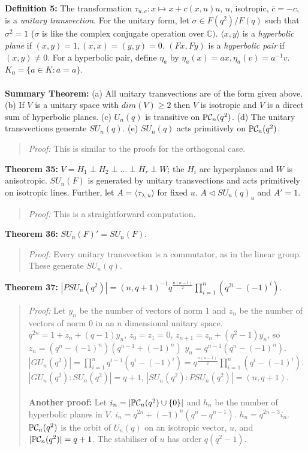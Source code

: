 {\bf Definition 5:} The transformation 
$\tau_{u,c}: x \mapsto x + c(x, u)u$, $u$, isotropic, ${\overline c} = - c$, is a 
\emph{unitary transvection}.  For the unitary form, let $\sigma \in F(q^2)/F(q)$ such
that $\sigma^2=1$ ($\sigma$ is like the complex conjugate operation over ${\mathbb C})$.
$ \langle x, y \rangle $ is a \emph{hyperbolic plane} if 
$(x, y)= 1, (x,x)=(y,y)=0$. $(Fx, Fy)$ is a
\emph{hyperbolic pair} if $(x,y) \ne 0$.  For a hyperbolic pair, define $\eta_a$ by
$\eta_a(x)= ax, \eta_a(v)= a^{-1}v$.  $K_0= \{ a \in K: {\overline a} = a \}$.
\\
\\
{\bf Summary Theorem:} (a) All unitary transvections are of the form given above.  (b) If $V$ is a unitary
space with $dim(V) \geq 2$ then $V$ is isotropic and $V$ is a direct sum of hyperbolic planes.
(c) $U_n(q)$ is transitive on ${\mathbb P}{\cal C}_n(q^2)$.  (d) The unitary transvections
generate $SU_n(q)$. (e) $SU_n(q)$ acts primitively on ${\mathbb P}{\cal C}_n(q^2)$.
\begin{quote}
\emph{Proof:}  
This is similar to the proofs for the orthogonal case.
\end{quote}
{\bf Theorem 35:}
$V = H_1 \perp H_2 \perp \ldots \perp H_r \perp W$; the $H_i$ are hyperplanes and $W$ is
anisotropic.
$SU_n(F)$ is generated by unitary transvections and acts primitively on isotropic lines.
Further, let $A= \langle \tau_{\lambda,u} \rangle $ for fixed $u$.  
$A \lhd SU_n(q)_u$ and $A' = 1$.
\begin{quote}
\emph{Proof:}  
This is a straightforward computation.
\end{quote}
{\bf Theorem 36:}
$SU_n(F)'=SU_n(F)$.
\begin{quote}
\emph{Proof:}  
Every unitary transvection is a commutator, as in the linear group.  These generate
$SU_n(q)$.
\end{quote}
{\bf Theorem 37:} 
$|PSU_n(q^2)|= (n, q+1)^{-1} q^{\frac {n(n-1)} {2}} \prod_{i=1}^n (q^{2i}-(-1)^i)$.
\begin{quote}
\emph{Proof:}  
Let $y_n$ be the number of vectors of norm $1$ and $z_n$ be the number of vectors of norm $0$ in an $n$
dimensional unitary space.
$q^{2n}= 1+ z_n + (q-1) y_n$, $z_0 = z_1 =0$,
$z_{n+1}= z_n + (q^2-1) y_n$, so 
$z_n= (q^n - (-1)^n)(q^{n-1} + (-1)^n)$
$y_n= q^{n-1}(q^n - (-1)^n)$.\\
$|GU_n(q^2)|= \prod_{i=1}^n q^{i-1} (q^i - (-1)^i)= q^{\frac {n(n-1)} 2} \prod_{i=1}^n (q^i - (-1)^i)$. \\
$|GU_n(q^2):SU_n(q^2)|= q+1$,
$|SU_n(q^2):PSU_n(q^2)|= (n,q+1)$.
\\
\\
{\bf Another proof:} Let $i_n= |{\mathbb P}{\cal C}_n(q^2) \cup \{0\}|$ and $h_n$ be the number of hyperbolic planes in $V$.
$i_n= q^{2n} + (-1)^n(q^n-q^{n-1})$. $h_n = q^{2n-3} i_n$.  ${\mathbb P}{\cal C}_n(q^2)$ is the orbit of $U_n(q)$ on
an isotropic vector, $u$, and $|{\mathbb P}{\cal C}_n(q^2)|= q+1$.  The stabiliser of $u$ has order $q(q^2-1)$.
\end{quote}
